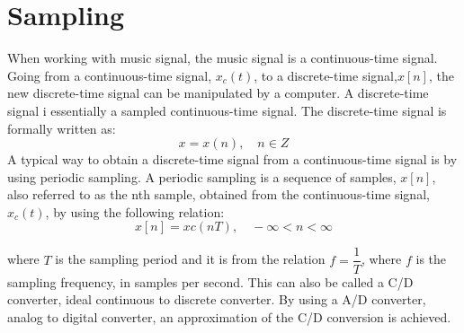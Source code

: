 \section{Sampling}
When working with music signal, the music signal is a continuous-time signal.
Going from a continuous-time signal, $x_c(t)$, to a discrete-time signal,$x[n]$, the new discrete-time signal can be manipulated by a computer. A discrete-time signal i essentially a sampled continuous-time signal. The discrete-time signal is formally written as:
$$x={x(n)}, \quad    n \in Z$$
A typical way to obtain a discrete-time signal from a continuous-time signal is by using periodic sampling. A periodic sampling is a sequence of samples, $x[n]$, also referred to as the nth sample, obtained from the continuous-time signal,$x_c(t)$, by using the following relation:
$$x[n]=xc (nT), \quad    - \infty <n< \infty$$

where $T$ is the sampling period and it is from the relation $f=\dfrac{1}{T}$, where $f$ is the sampling frequency, in samples per second. This can also be called a C/D converter, ideal continuous to discrete converter. 
By using a A/D converter, analog to digital converter, an approximation of the C/D conversion is achieved. \cite[p. 140-142]{DiscreteTimeSignal}
